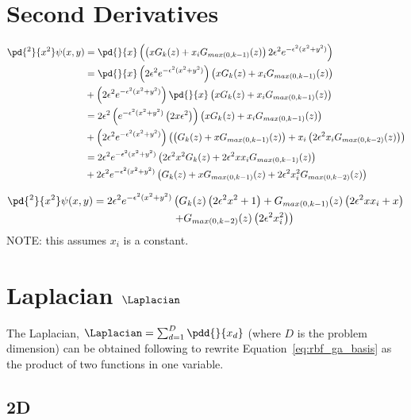 \documentclass[11pt]{report}
\begin{document}
{\section{Second Derivatives}
\begin{align*}
\pd{^2}{x^2}\psi(x,y)   & = \pd{}{x} \left(\left( x G_k(z) + x_i G_{max(0,k-1)}( z )  \right) 2\epsilon^2 e^{-\epsilon^2(x^2 + y^2)}\right) \\
& = \pd{}{x}\left(  2\epsilon^2 e^{-\epsilon^2(x^2 + y^2)} \right) \left( x G_k(z) + x_i G_{max(0,k-1)}( z )  \right) \\ 
& + \left(  2\epsilon^2 e^{-\epsilon^2(x^2 + y^2)} \right) \pd{}{x} \left( x G_k(z) + x_i G_{max(0,k-1)}( z )  \right) \\
& =  2\epsilon^2 \left( e^{-\epsilon^2 (x^2 + y^2)} \left(2x \epsilon^2 \right) \right) \left( x G_k(z) + x_i G_{max(0,k-1)}( z )  \right) \\ 
& + \left(  2\epsilon^2 e^{-\epsilon^2(x^2 + y^2)} \right) \left( \left(G_k(z) + x G_{max(0,k-1)}(z) \right) + x_i \left( 2 \epsilon^2 x_i G_{max(0,k-2)}( z ) \right) \right) \\
& = 2 \epsilon^2 e^{-\epsilon^2(x^2 + y^2)} \left( 2 \epsilon^2 x^2 G_k(z) + 2 \epsilon^2 x x_i G_{max(0,k-1)}( z )  \right) \\ 
& + 2\epsilon^2 e^{-\epsilon^2(x^2 + y^2)} \left( G_k(z) + x G_{max(0,k-1)}(z) +  2 \epsilon^2 x_i^2 G_{max(0,k-2)}( z ) \right) 
\end{align*}

\begin{align}
\pd{^2}{x^2}\psi(x,y)  = 2 \epsilon^2 e^{-\epsilon^2(x^2 + y^2)} & \left( G_k(z) \left( 2 \epsilon^2 x^2 + 1 \right) +  G_{max(0,k-1)}(z) \left( 2 \epsilon^2 x x_i + x \right)  \right. \nonumber \\
& \left. + G_{max(0,k-2)}( z ) \left(2 \epsilon^2 x_i^2\right) \right)
\label{eq:second_x_product_rule}
\end{align}
NOTE: this assumes $x_i$ is a constant. 


\section{Laplacian $\Laplacian$}

The Laplacian, $\Laplacian = \sum_{d=1}^{D}  \pdd{}{x_d}$ (where $D$ is the problem dimension) can be obtained following \cite{FornbergLehtoPowell12} to rewrite Equation~\ref{eq:rbf_ga_basis} as the product of two functions in one variable. 

\subsection{2D}

}
\end{document}
